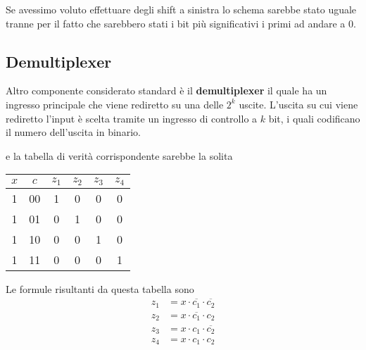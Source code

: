 Se avessimo voluto effettuare degli shift a sinistra lo schema sarebbe stato uguale tranne per il
fatto che sarebbero stati i bit più significativi i primi ad andare a 0.

\subsection{Demultiplexer}
Altro componente considerato standard è il \textbf{demultiplexer} il quale ha un ingresso principale
che viene rediretto su una delle $2^k$ uscite. L'uscita su cui viene rediretto l'input è scelta
tramite un ingresso di controllo a $k$ bit, i quali codificano il numero dell'uscita in binario.
\begin{center}
\end{center}
e la tabella di verità corrispondente sarebbe la solita
\begin{center}
	\begin{tabular}{c c | c c c c}
		$x$ & $c$ & $z_1$ & $z_2$ & $z_3$ & $z_4$ \\ \hline
		1   & 00  & 1     & 0     & 0     & 0     \\
		1   & 01  & 0     & 1     & 0     & 0     \\
		1   & 10  & 0     & 0     & 1     & 0     \\
		1   & 11  & 0     & 0     & 0     & 1
	\end{tabular}
\end{center}
Le formule risultanti da questa tabella sono
\begin{align*}
	z_1 & = x \cdot \overline{c_1} \cdot \overline{c_2} \\
	z_2 & = x \cdot \overline{c_1} \cdot c_2            \\
	z_3 & = x \cdot c_1 \cdot \overline{c_2}            \\
	z_4 & = x \cdot c_1 \cdot c_2
\end{align*}

